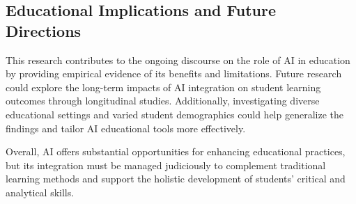 \subsection{Educational Implications and Future Directions}
This research contributes to the ongoing discourse on the role of AI in education by providing empirical evidence of its benefits and limitations. Future research could explore the long-term impacts of AI integration on student learning outcomes through longitudinal studies. Additionally, investigating diverse educational settings and varied student demographics could help generalize the findings and tailor AI educational tools more effectively.

Overall, AI offers substantial opportunities for enhancing educational practices, but its integration must be managed judiciously to complement traditional learning methods and support the holistic development of students' critical and analytical skills.

